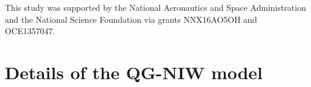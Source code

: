 \documentclass{jfm}
\begin{document}




%
%
\vspace{1.cm}
This study was supported by the National Aeronautics and Space Administration
and the National Science Foundation via grants NNX16AO5OH and OCE1357047.

%
%

\appendix

\section{Details of the QG-NIW model}
\end{document}
